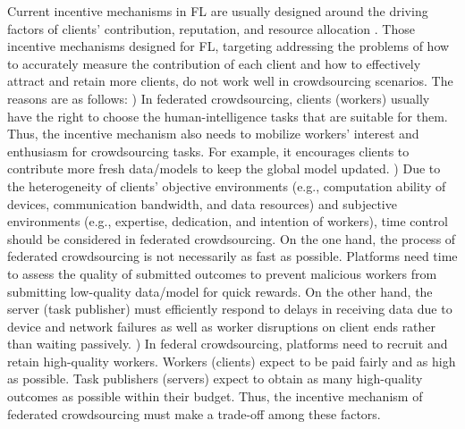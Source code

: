 \documentclass[final,1p,times]{elsarticle}
\begin{document}
Current incentive mechanisms in FL are usually designed around the driving factors of clients’ contribution, reputation, and resource allocation \citep{zhan2020learning,zhan2021survey}. Those incentive mechanisms designed for FL, targeting addressing the problems of how to accurately measure the contribution of each client and how to effectively attract and retain more clients, do not work well in crowdsourcing scenarios. The reasons are as follows: \lowercase{}) In federated crowdsourcing, clients (workers) usually have the right to choose the human-intelligence tasks that are suitable for them. Thus, the incentive mechanism also needs to mobilize workers' interest and enthusiasm for crowdsourcing tasks. For example, it encourages clients to contribute more fresh data/models to keep the global model updated. \lowercase{}) Due to the heterogeneity of clients' objective environments (e.g., computation ability of devices, communication bandwidth, and data resources) and subjective environments (e.g., expertise, dedication, and intention of workers), time control should be considered in federated crowdsourcing. On the one hand, the process of federated crowdsourcing is not necessarily as fast as possible. Platforms need time to assess the quality of submitted outcomes to prevent malicious workers from submitting low-quality data/model for quick rewards. On the other hand, the server (task publisher) must efficiently respond to delays in receiving data due to device and network failures as well as worker disruptions on client ends rather than waiting passively. \lowercase{}) In federal crowdsourcing, platforms need to recruit and retain high-quality workers. Workers (clients) expect to be paid fairly and as high as possible. Task publishers (servers) expect to obtain as many high-quality outcomes as possible within their budget. Thus, the incentive mechanism of federated crowdsourcing must make a trade-off among these factors.
\end{document}
